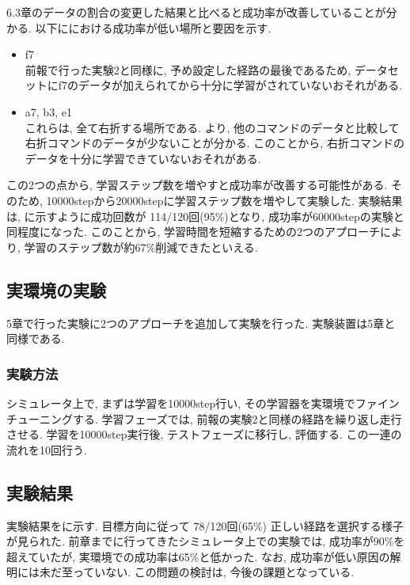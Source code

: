 \documentclass{jarticle}
\begin{document}
 6.3章のデータの割合の変更した結果と比べると成功率が改善していることが分かる. 以下ににおける成功率が低い場所と要因を示す.

 \begin{itemize}
  \item f7\\
  前報\cite{mech}で行った実験2と同様に, 予め設定した経路の最後であるため, データセットにf7のデータが加えられてから十分に学習がされていないおそれがある.
  \item a7, b3, e1\\
  これらは, 全て右折する場所である. より, 他のコマンドのデータと比較して右折コマンドのデータが少ないことが分かる. このことから, 右折コマンドのデータを十分に学習できていないおそれがある. 
 \end{itemize}
 
この2つの点から, 学習ステップ数を増やすと成功率が改善する可能性がある. そのため, 10000stepから20000stepに学習ステップ数を増やして実験した. 実験結果は, に示すように成功回数が 114/120回(95\%)となり, 成功率が60000stepの実験と同程度になった. このことから, 学習時間を短縮するための2つのアプローチにより, 学習のステップ数が約67\%削減できたといえる.

\subsection{実環境の実験}
5章で行った実験に2つのアプローチを追加して実験を行った. 実験装置は5章と同様である.


\subsubsection{実験方法}
シミュレータ上で, まずは学習を10000step行い, その学習器を実環境でファインチューニングする. 学習フェーズでは, 前報\cite{mech}の実験2と同様の経路を繰り返し走行させる. 学習を10000step実行後, テストフェーズに移行し, 評価する. この一連の流れを10回行う.

\subsection{実験結果}
実験結果をに示す. 目標方向に従って 78/120回(65\%) 正しい経路を選択する様子が見られた. 前章までに行ってきたシミュレータ上での実験では, 成功率が90\%を超えていたが, 実環境での成功率は65\%と低かった. なお, 成功率が低い原因の解明には未だ至っていない. この問題の検討は, 今後の課題となっている.
\end{document}
